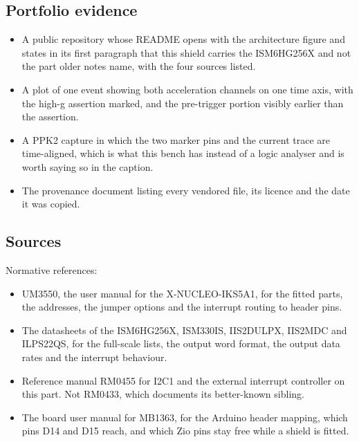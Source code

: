 \subsection*{Portfolio evidence}

\begin{itemize}
\item A public repository whose README opens with the architecture figure and
states in its first paragraph that this shield carries the ISM6HG256X and not
the part older notes name, with the four sources listed.
\item A plot of one event showing both acceleration channels on one time axis,
with the high-g assertion marked, and the pre-trigger portion visibly earlier
than the assertion.
\item A PPK2 capture in which the two marker pins and the current trace are
time-aligned, which is what this bench has instead of a logic analyser and is
worth saying so in the caption.
\item The provenance document listing every vendored file, its licence and the
date it was copied.
\end{itemize}

\subsection*{Sources}

Normative references:
\begin{itemize}
\item UM3550, the user manual for the X-NUCLEO-IKS5A1, for the fitted parts, the
addresses, the jumper options and the interrupt routing to header pins.
\item The datasheets of the ISM6HG256X, ISM330IS, IIS2DULPX, IIS2MDC and
ILPS22QS, for the full-scale lists, the output word format, the output data
rates and the interrupt behaviour.
\item Reference manual RM0455 for I2C1 and the external interrupt controller on
this part. Not RM0433, which documents its better-known sibling.
\item The board user manual for MB1363, for the Arduino header mapping, which
pins D14 and D15 reach, and which Zio pins stay free while a shield is fitted.
\end{itemize}

